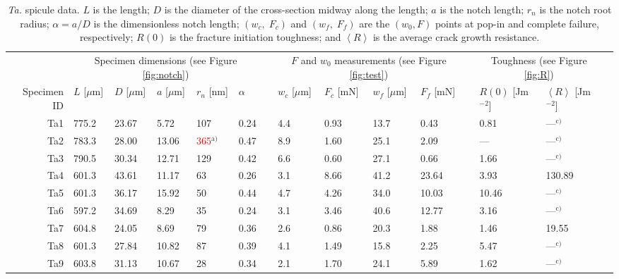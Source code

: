 \documentclass[12pt,onecolumn]{article}
\makeatletter
\newcommand{\TA}{\textit{Ta.\@}\xspace}
\newcommand{\ra}[1]{\renewcommand{\arraystretch}{#1}}
\makeatother
\begin{document}
\thispagestyle{empty}
\begin{landscape}

\begin{table}
\small
\centering
\caption{\TA spicule data. $L$ is the length; $D$ is the diameter of the cross-section midway along the length; $a$ is the notch length; $r_n$ is the notch root radius; $\alpha=a/D$ is the dimensionless notch length; $(w_c,\;F_c)$ and $(w_f,\;F_f)$ are the $(w_0,F)$ points at pop-in and complete failure, respectively; $R(0)$ is the fracture initiation toughness; and $\left< R \right>$ is the average crack growth resistance.}
\label{tab:TAdata}
\ra{1.25}
\begin{threeparttable}
\begin{tabular}{rllllllllllllll}
\toprule
& \multicolumn{5}{c}{Specimen dimensions (see Figure \ref{fig:notch})} & & \multicolumn{4}{c}{$F$ and $w_0$ measurements (see Figure \ref{fig:test})} & & \multicolumn{2}{c}{Toughness (see Figure \ref{fig:R})} \\
\cmidrule{2-6} \cmidrule{8-11} \cmidrule{13-14}
Specimen ID & $L$ [$\mu$m] & $D$ [$\mu$m] & $a$ [$\mu$m] & $r_n$ [nm] & $\alpha$ & & $w_c$ [$\mu$m] & $F_c$ [mN] & $w_f$ [$\mu$m] & $F_f$ [mN] & & $R(0)$ [Jm$^{-2}$] & $\left< R \right>$ [Jm$^{-2}$] \\
\midrule
Ta1 & 775.2 & 23.67 & 5.72 &  107 & 0.24 &  &  4.4 & 0.93 & 13.7 & 0.43 &  & 0.81 &---$^\text{c)}$\\ 
Ta2 & 783.3 & 28.00 & 13.06 &  \textcolor{red}{365}$^\text{a)}$ & 0.47 &  &  8.9 & 1.60 & 25.1 & 2.09 &  & --- &---$^\text{c)}$\\ 
Ta3 & 790.5 & 30.34 & 12.71 &  129 & 0.42 &  &  6.6 & 0.60 & 27.1 & 0.66 &  & 1.66 &---$^\text{c)}$\\ 
Ta4 & 601.3 & 43.61 & 11.17 &   63 & 0.26 &  &  3.1 & 8.66 & 41.2 & 23.64 &  & 3.93 &130.89 \\ 
Ta5 & 601.3 & 36.17 & 15.92 &   50 & 0.44 &  &  4.7 & 4.26 & 34.0 & 10.03 &  & 10.46 &---$^\text{c)}$\\ 
Ta6 & 597.2 & 34.69 & 8.29 &   35 & 0.24 &  &  3.1 & 3.46 & 40.6 & 12.77 &  & 3.16 &---$^\text{c)}$\\ 
Ta7 & 604.8 & 24.05 & 8.69 &   79 & 0.36 &  &  2.6 & 0.86 & 20.3 & 1.88 &  & 1.46 &19.55 \\ 
Ta8 & 601.3 & 27.84 & 10.82 &   87 & 0.39 &  &  4.1 & 1.49 & 15.8 & 2.25 &  & 5.47 &---$^\text{c)}$\\ 
Ta9 & 603.8 & 31.13 & 10.67 &   28 & 0.34 &  &  2.1 & 1.70 & 24.1 & 5.89 &  & 1.62 &---$^\text{c)}$\\ 

\end{tabular}
\end{threeparttable}
\end{table}
\end{landscape}
\end{document}
